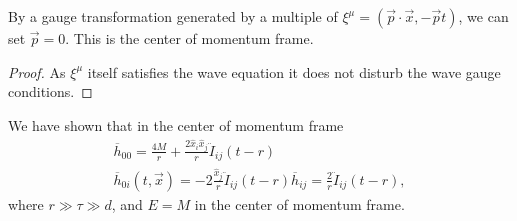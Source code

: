 \begin{exercise}
    By a gauge transformation generated by a multiple of $\xi^{\mu} = \left( \vec{p}\cdot \vec{x}, - \vec{p}t \right) $, we can set $\vec{p} = 0$. This is the center of momentum frame.
\end{exercise}

\begin{proof}
    As $\xi^{\mu}$ itself satisfies the wave equation it does not disturb the wave gauge conditions.
\end{proof}

We have shown that in the center of momentum frame
\begin{align}
    \overline{h}_{00} = \frac{4M}{r} + \frac{2\hat{x}_{i} \hat{x}_{j}}{r} \ddot{I}_{ij}\left( t - r \right)  \\
    \overline{h}_{0i}\left( t, \vec{x} \right) = -2 \frac{\hat{x}_j}{r} \ddot{I}_{ij} \left( t - r \right) 
    \overline{h}_{ij} = \frac{2}{r} \ddot{I}_{ij}\left( t - r \right) 
,\end{align}
where $r \gg \tau \gg d$, and $E = M$ in the center of momentum frame.



